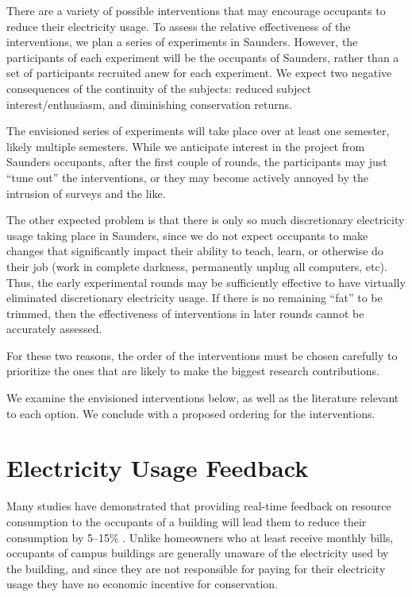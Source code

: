 \documentclass[11pt]{article}
\begin{document}
There are a variety of possible interventions that may encourage occupants to reduce their electricity usage. To assess the relative effectiveness of the interventions, we plan a series of experiments in Saunders. However, the participants of each experiment will be the occupants of Saunders, rather than a set of participants recruited anew for each experiment. We expect two negative consequences of the continuity of the subjects: reduced subject interest/enthusiasm, and diminishing conservation returns.

The envisioned series of experiments will take place over at least one semester, likely multiple semesters. While we anticipate interest in the project from Saunders occupants, after the first couple of rounds, the participants may just ``tune out'' the interventions, or they may become actively annoyed by the intrusion of surveys and the like.

The other expected problem is that there is only so much discretionary electricity usage taking place in Saunders, since we do not expect occupants to make changes that significantly impact their ability to teach, learn, or otherwise do their job (work in complete darkness, permanently unplug all computers, etc). Thus, the early experimental rounds may be sufficiently effective to have virtually eliminated discretionary electricity usage. If there is no remaining ``fat'' to be trimmed, then the effectiveness of interventions in later rounds cannot be accurately assessed.

For these two reasons, the order of the interventions must be chosen carefully to prioritize the ones that are likely to make the biggest research contributions.

We examine the envisioned interventions below, as well as the literature relevant to each option. We conclude with a proposed ordering for the interventions.

\section{Electricity Usage Feedback}

Many studies have demonstrated that providing real-time feedback on resource consumption to the occupants of a building will lead them to reduce their consumption by 5--15\% \cite{darby-review-2006}. Unlike homeowners who at least receive monthly bills, occupants of campus buildings are generally unaware of the electricity used by the building, and since they are not responsible for paying for their electricity usage they have no economic incentive for conservation.
\end{document}
